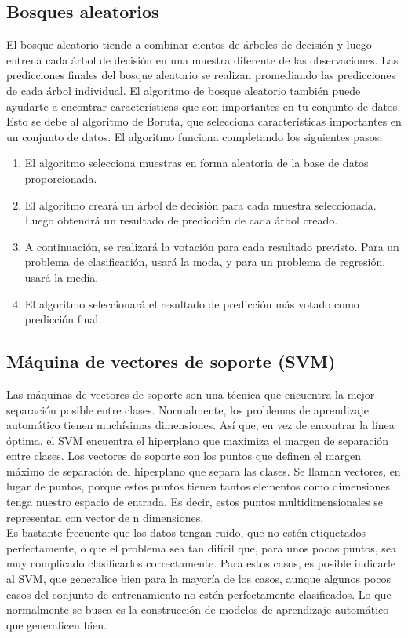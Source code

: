 \documentclass[conference]{IEEEtran}
\begin{document}
\subsection{Bosques aleatorios}
El bosque aleatorio tiende a combinar cientos de árboles de decisión y luego entrena cada árbol de decisión en una muestra diferente de las observaciones. Las predicciones finales del bosque aleatorio se realizan promediando las predicciones de cada árbol individual. El algoritmo de bosque aleatorio también puede ayudarte a encontrar características que son importantes en tu conjunto de datos. Esto se debe al algoritmo de Boruta, que selecciona características importantes en un conjunto de datos. El algoritmo funciona completando los siguientes pasos:
\begin{enumerate}
\item El algoritmo selecciona muestras en forma aleatoria de la base de datos proporcionada.
\item El algoritmo creará un árbol de decisión para cada muestra seleccionada. Luego obtendrá un resultado de predicción de cada árbol creado.
\item A continuación, se realizará la votación para cada resultado previsto. Para un problema de clasificación, usará la moda, y para un problema de regresión, usará la media.
\item El algoritmo seleccionará el resultado de predicción más votado como predicción final.
\end{enumerate}

\subsection{Máquina de vectores de soporte (SVM)}
Las máquinas de vectores de soporte son una técnica que encuentra la mejor separación posible entre clases. Normalmente, los problemas de aprendizaje automático tienen muchísimas dimensiones. Así que, en vez de encontrar la línea óptima, el SVM encuentra el hiperplano que maximiza el margen de separación entre clases. Los vectores de soporte son los puntos que definen el margen máximo de separación del hiperplano que separa las clases. Se llaman vectores, en lugar de puntos, porque estos puntos tienen tantos elementos como dimensiones tenga nuestro espacio de entrada. Es decir, estos puntos multidimensionales se representan con vector de n dimensiones.\\

Es bastante frecuente que los datos tengan ruido, que no estén etiquetados perfectamente, o que el problema sea tan difícil que, para unos pocos puntos, sea muy complicado clasificarlos correctamente. Para estos casos, es posible indicarle al SVM, que generalice bien para la mayoría de los casos, aunque algunos pocos casos del conjunto de entrenamiento no estén perfectamente clasificados. Lo que normalmente se busca es la construcción de modelos de aprendizaje automático que generalicen bien. \\
\end{document}
